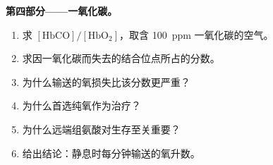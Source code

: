 \begin{problem}
\medskip\noindent\textbf{第四部分——一氧化碳。}
\begin{enumerate}[resume]
  \item 求 $[\mathrm{HbCO}]/[\mathrm{HbO_2}]$，取含 \qty{100}{ppm} 一氧化碳的空气。
  \item 求因一氧化碳而失去的结合位点所占的分数。
  \item 为什么输送的氧损失比该分数更严重？
  \item 为什么首选纯氧作为治疗？
  \item 为什么远端组氨酸对生存至关重要？
  \item 给出结论：静息时每分钟输送的氧升数。
\end{enumerate}
\end{problem}
